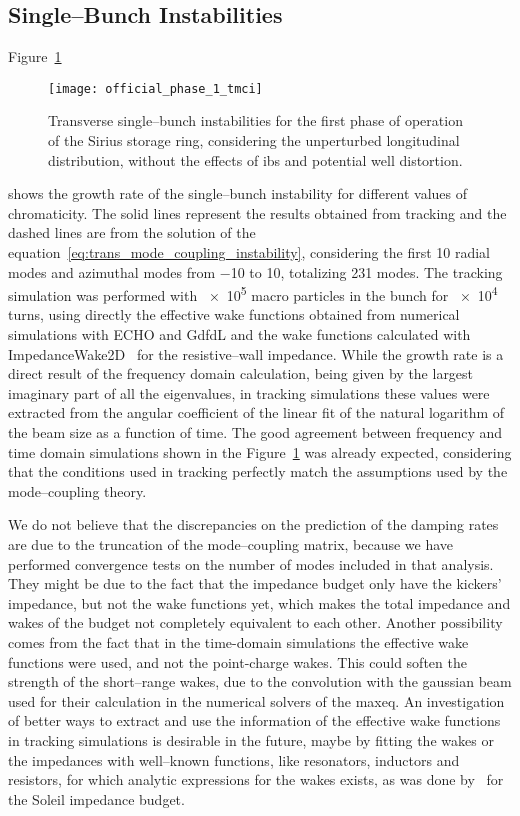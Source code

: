 \subsection{Single--Bunch Instabilities}

    Figure~\ref{fig:ph1_chrom_tmci}
    \begin{figure}
        \centering
        \texttt{[image: official\_phase\_1\_tmci]}
        \caption{Transverse single--bunch instabilities for the first phase of operation of the Sirius storage ring, considering the unperturbed longitudinal distribution, without the effects of \gls{ibs} and potential well distortion.}
        \label{fig:ph1_chrom_tmci}
    \end{figure}
    shows the growth rate of the single--bunch instability for different values of chromaticity. The solid lines represent the results obtained from tracking and the dashed lines are from the solution of the equation~\eqref{eq:trans_mode_coupling_instability}, considering the first 10 radial modes and azimuthal modes from \num{-10} to \num{10}, totalizing \num{231} modes. The tracking simulation was performed with \num{e5} macro particles in the bunch for \num{e4} turns, using directly the effective wake functions obtained from numerical simulations with ECHO and GdfdL and the wake functions calculated with ImpedanceWake2D~\cite{Mounet2010} for the resistive--wall impedance.
    While the growth rate is a direct result of the frequency domain calculation, being given by the largest imaginary part of all the eigenvalues, in tracking simulations these values were extracted from the angular coefficient of the linear fit of the natural logarithm of the beam size as a function of time. The good agreement between frequency and time domain simulations shown in the Figure~\ref{fig:ph1_chrom_tmci} was already expected, considering that the conditions used in tracking perfectly match the assumptions used by the mode--coupling theory.

    We do not believe that the discrepancies on the prediction of the damping rates are due to the truncation of the mode--coupling matrix, because we have performed convergence tests on the number of modes included in that analysis. They might be due to the fact that the impedance budget only have the kickers' impedance, but not the wake functions yet, which makes the total impedance and wakes of the budget not completely equivalent to each other. Another possibility comes from the fact that in the time-domain simulations the effective wake functions were used, and not the point-charge wakes. This could soften the strength of the short--range wakes, due to the convolution with the gaussian beam used for their calculation in the numerical solvers of the \gls{maxeq}. An investigation of better ways to extract and use the information of the effective wake functions in tracking simulations is desirable in the future, maybe by fitting the wakes or the impedances with well--known functions, like resonators, inductors and resistors, for which analytic expressions for the wakes exists, as was done by~ for the Soleil impedance budget.

